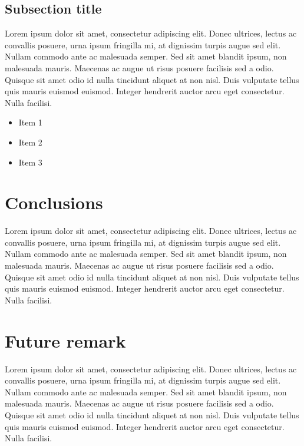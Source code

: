 \documentclass[12pt, twoside]{article}
\begin{document}
\subsection{Subsection title}
Lorem ipsum dolor sit amet, consectetur adipiscing elit. Donec ultrices, lectus ac convallis posuere, urna ipsum fringilla mi, at dignissim turpis augue sed elit. Nullam commodo ante ac malesuada semper. Sed sit amet blandit ipsum, non malesuada mauris. Maecenas ac augue ut risus posuere facilisis sed a odio. Quisque sit amet odio id nulla tincidunt aliquet at non nisl. Duis vulputate tellus quis mauris euismod euismod. Integer hendrerit auctor arcu eget consectetur. Nulla facilisi.

\begin{itemize}
\item Item 1
\item Item 2
\item Item 3
\end{itemize}

\section{Conclusions}
Lorem ipsum dolor sit amet, consectetur adipiscing elit. Donec ultrices, lectus ac convallis posuere, urna ipsum fringilla mi, at dignissim turpis augue sed elit. Nullam commodo ante ac malesuada semper. Sed sit amet blandit ipsum, non malesuada mauris. Maecenas ac augue ut risus posuere facilisis sed a odio. Quisque sit amet odio id nulla tincidunt aliquet at non nisl. Duis vulputate tellus quis mauris euismod euismod. Integer hendrerit auctor arcu eget consectetur. Nulla facilisi.

\section{Future remark}
Lorem ipsum dolor sit amet, consectetur adipiscing elit. Donec ultrices, lectus ac convallis posuere, urna ipsum fringilla mi, at dignissim turpis augue sed elit. Nullam commodo ante ac malesuada semper. Sed sit amet blandit ipsum, non malesuada mauris. Maecenas ac augue ut risus posuere facilisis sed a odio. Quisque sit amet odio id nulla tincidunt aliquet at non nisl. Duis vulputate tellus quis mauris euismod euismod. Integer hendrerit auctor arcu eget consectetur. Nulla facilisi.



\end{document}
